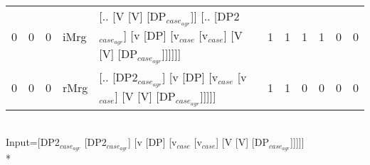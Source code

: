 \begin{tabularx}{\linewidth}{rrrlXrrrrrr}
   0 &       0 &   0 & iMrg & [.. [V [V] [DP$_{case_{agr}}$]] [.. [DP2$_{case_{agr}}$] [v [DP] [v$_{case}$ [v$_{case}$] [V [V] [DP$_{case_{agr}}$]]]]]]                            &             1 &             1 &                  1 &            1 &             0 &            0 \\
   0 &       0 &   0 & rMrg & [.. [DP2$_{case_{agr}}$] [v [DP] [v$_{case}$ [v$_{case}$] [V [V] [DP$_{case_{agr}}$]]]]]                                                       &             1 &             1 &                  0 &            0 &             0 &            0 \\
\hline
\end{tabularx}\endgroup\\
\begingroup\scriptsize Input=[DP2$_{case_{agr}}$ [DP2$_{case_{agr}}$] [v [DP] [v$_{case}$ [v$_{case}$] [V [V] [DP$_{case_{agr}}$]]]]]\\*
